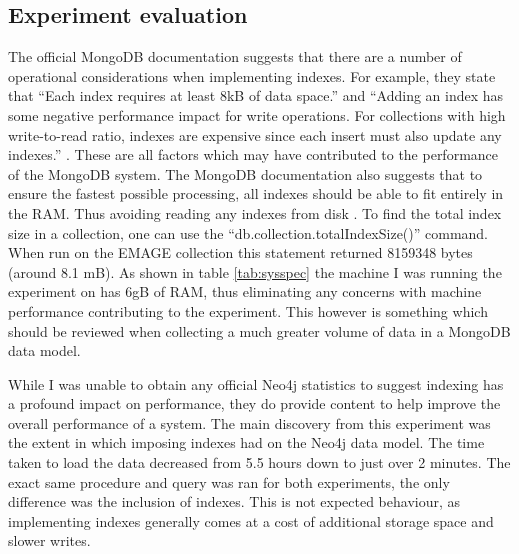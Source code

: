\subsection{Experiment evaluation}\label{experimentdiscussion}
The official MongoDB documentation suggests that there are a number of operational considerations when implementing indexes. For example, they state that ``Each index requires at least 8kB of data space.'' and ``Adding an index has some negative performance impact for write operations. For collections with high write-to-read ratio, indexes are expensive since each insert must also update any indexes.'' \cite{mongdoc}. These are all factors which may have contributed to the performance of the MongoDB system. The MongoDB documentation also suggests that to ensure the fastest possible processing, all indexes should be able to fit entirely in the RAM. Thus avoiding reading any indexes from disk \cite{mongdoc}. To find the total index size in a collection, one can use the ``db.collection.totalIndexSize()'' command. When run on the EMAGE collection this statement returned 8159348 bytes (around 8.1 mB). As shown in table \ref{tab:sysspec} the machine I was running the experiment on has 6gB of RAM, thus eliminating any concerns with machine performance contributing to the experiment. This however is something which should be reviewed when collecting a much greater volume of data in a MongoDB data model.

While I was unable to obtain any official Neo4j statistics to suggest indexing has a profound impact on performance, they do provide content to help improve the overall performance of a system. The main discovery from this experiment was the extent in which imposing indexes had on the Neo4j data model. The time taken to load the data decreased from 5.5 hours down to just over 2 minutes. The exact same procedure and query was ran for both experiments, the only difference was the inclusion of indexes. This is not expected behaviour, as implementing indexes generally comes at a cost of additional storage space and slower writes.

